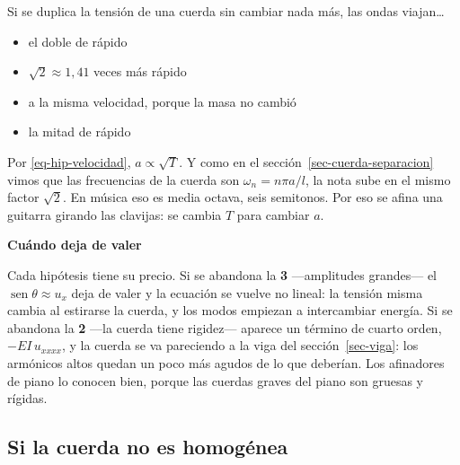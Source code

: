 \documentclass[
  spanish,
  a4paper,
]{scrbook}
\providecommand{\tightlist}{%
  \setlength{\itemsep}{0pt}\setlength{\parskip}{0pt}}
\theoremstyle{definition}
\theoremstyle{plain}
\theoremstyle{definition}
\theoremstyle{plain}
\theoremstyle{definition}
\theoremstyle{remark}
\begin{document}
Si se duplica la tensión de una cuerda sin cambiar nada más, las ondas
viajan\ldots{}

\begin{itemize}
\tightlist
\item
  {el doble de rápido}
\item
  {\(\sqrt 2 \approx 1{,}41\) veces más rápido}
\item
  {a la misma velocidad, porque la masa no cambió}
\item
  {la mitad de rápido}
\end{itemize}

Por \ref{eq-hip-velocidad}, \(a\propto\sqrt T\). Y como en el
sección~\ref{sec-cuerda-separacion} vimos que las frecuencias de la
cuerda son \(\omega_n = n\pi a/l\), la nota sube en el mismo factor
\(\sqrt2\). En música eso es media octava, seis semitonos. Por eso se
afina una guitarra girando las clavijas: se cambia \(T\) para cambiar
\(a\).

\begin{tcolorbox}[enhanced jigsaw, arc=.35mm, bottomrule=.15mm, breakable, colback=white, colframe=quarto-callout-note-color-frame, left=2mm, leftrule=.75mm, opacityback=0, rightrule=.15mm, toprule=.15mm]
\begin{minipage}[t]{5.5mm}
\textcolor{quarto-callout-note-color}{\faInfo}
\end{minipage}%
\begin{minipage}[t]{\textwidth - 5.5mm}

\vspace{-3mm}\textbf{Cuándo deja de valer}\vspace{3mm}

Cada hipótesis tiene su precio. Si se abandona la \textbf{3}
---amplitudes grandes--- el \(\operatorname{sen}\theta\approx u_x\) deja
de valer y la ecuación se vuelve no lineal: la tensión misma cambia al
estirarse la cuerda, y los modos empiezan a intercambiar energía. Si se
abandona la \textbf{2} ---la cuerda tiene rigidez--- aparece un término
de cuarto orden, \(-EI\,u_{xxxx}\), y la cuerda se va pareciendo a la
viga del sección~\ref{sec-viga}: los armónicos altos quedan un poco más
agudos de lo que deberían. Los afinadores de piano lo conocen bien,
porque las cuerdas graves del piano son gruesas y rígidas.

\end{minipage}%
\end{tcolorbox}

\subsection{Si la cuerda no es homogénea}\label{sec-hip-inhomogenea}
\end{document}
